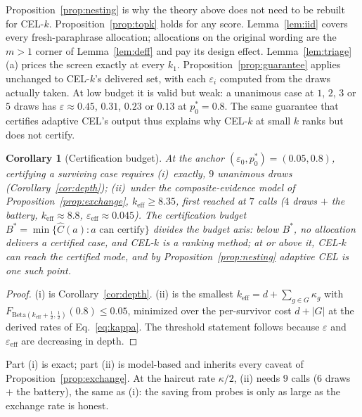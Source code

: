 \documentclass[11pt]{article}
\newtheorem{corollary}{Corollary}
\newcommand{\Betadist}{\mathrm{Beta}}
\newcommand{\keff}{k_{\mathrm{eff}}}
\begin{document}
Proposition~\ref{prop:nesting} is why the theory above does not need
to be rebuilt for CEL-$k$. Proposition~\ref{prop:topk} holds for any
score. Lemma~\ref{lem:iid} covers every fresh-paraphrase allocation;
allocations on the original wording are the $m > 1$ corner of
Lemma~\ref{lem:deff} and pay its design effect.
Lemma~\ref{lem:triage}(a) prices the screen exactly at every $k_1$.
Proposition~\ref{prop:guarantee} applies unchanged to CEL-$k$'s
delivered set, with each $\varepsilon_i$ computed from the draws
actually taken. At low budget it is valid but weak: a unanimous case
at $1$, $2$, $3$ or $5$ draws has $\varepsilon \approx 0.45$, $0.31$,
$0.23$ or $0.13$ at $p_0^{\ast} = 0.8$. The same guarantee that
certifies adaptive CEL's output thus explains why CEL-$k$ at small $k$
ranks but does not certify.

\begin{corollary}[Certification budget]
\label{cor:certbudget}
At the anchor $(\varepsilon_0, p_0^{\ast}) = (0.05, 0.8)$, certifying
a surviving case requires (i)~exactly, $9$ unanimous draws
(Corollary~\ref{cor:depth}); (ii)~under the composite-evidence model
of Proposition~\ref{prop:exchange}, $\keff \ge 8.35$, first reached at
$7$ calls ($4$ draws $+$ the battery, $\keff \approx 8.8$,
$\varepsilon_{\mathrm{eff}} \approx 0.045$). The certification budget
$B^{\ast} = \min\{\hat C(a) : a \text{ can certify}\}$ divides the
budget axis: below $B^{\ast}$, no allocation delivers a certified
case, and CEL-$k$ is a ranking method; at or above it, CEL-$k$ can
reach the certified mode, and by Proposition~\ref{prop:nesting}
adaptive CEL is one such point.
\end{corollary}

\begin{proof}
(i) is Corollary~\ref{cor:depth}. (ii) is the smallest
$\keff = d + \sum_{g \in G} \kappa_g$ with
$F_{\Betadist(\keff + \frac12, \frac12)}(0.8) \le 0.05$, minimized over
the per-survivor cost $d + |G|$ at the derived rates of
Eq.~\eqref{eq:kappa}. The threshold statement follows because
$\varepsilon$ and $\varepsilon_{\mathrm{eff}}$ are decreasing in depth.
\end{proof}

Part (i) is exact; part (ii) is model-based and inherits every caveat of
Proposition~\ref{prop:exchange}. At the haircut rate $\kappa/2$, (ii)
needs $9$ calls ($6$ draws $+$ the battery), the same as (i): the
saving from probes is only as large as the exchange rate is honest.
\end{document}
